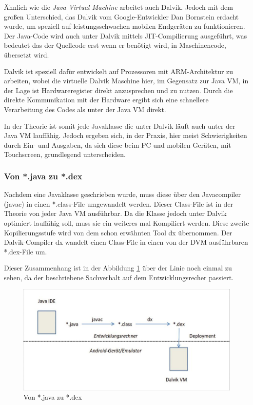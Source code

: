 \"Ahnlich wie die \emph{Java Virtual Machine} arbeitet auch Dalvik. Jedoch mit dem gro\ss{}en Unterschied, das Dalvik vom Google-Entwickler Dan Bornstein erdacht wurde, um speziell auf leistungsschwachen mobilen Endger\"aten zu funktionieren. Der Java-Code wird auch unter Dalvik mittels \ac{JIT}-Compilierung ausgef\"uhrt, was bedeutet das der Quellcode erst wenn er ben\"otigt wird, in Maschinencode, \"ubersetzt wird.

Dalvik ist speziell daf\"ur entwickelt auf Prozessoren mit ARM-Architektur zu arbeiten, wobei die virtuelle Dalvik Maschine hier, im Gegensatz zur Java VM, in der Lage ist Hardwareregister direkt anzusprechen und zu nutzen. Durch die direkte Kommunikation mit der Hardware ergibt sich eine schnellere Verarbeitung des Codes als unter der Java VM direkt.

In der Theorie ist somit jede Javaklasse die unter Dalvik l\"auft auch unter der Java VM lauff\"ahig. Jedoch ergeben sich, in der Praxis, hier meist Schwierigkeiten durch Ein- und Ausgaben, da sich diese beim PC und mobilen Ger\"aten, mit Touchscreen, grundlegend unterscheiden.

\subsubsection{Von *.java zu *.dex}
Nachdem eine Javaklasse geschrieben wurde, muss diese \"uber den Javacompiler (javac) in einen *.class-File umgewandelt werden. Dieser Class-File ist in der Theorie von jeder Java VM ausf\"uhrbar. Da die Klasse jedoch unter Dalvik optimiert lauff\"ahig soll, muss sie ein weiteres mal Kompiliert werden. Diese zweite Kopilierungsstufe wird von dem schon erw\"ahnten Tool dx \"ubernommen. 
Der Dalvik-Compiler dx wandelt einen Class-File in einen von der \ac{DVM} ausf\"uhrbaren *.dex-File um.

Dieser Zusammenhang ist in der Abbildung \ref{JavaZuDex} \"uber der Linie noch einmal zu sehen, da der beschriebene Sachverhalt auf dem Entwicklungsrecher passiert.

\begin{figure}[!ht]
\centering
\includegraphics[width=12cm]{Bilder/JavaZuDex}
\caption{Von *.java zu *.dex \cite{Android44}}
\label{JavaZuDex}
\centering
\end{figure}


